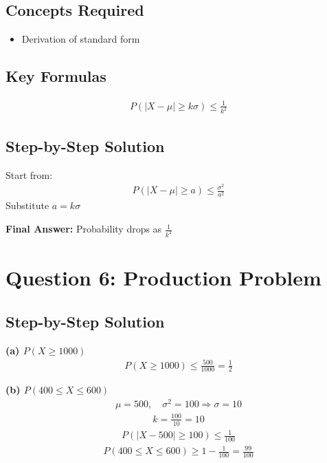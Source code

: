 \documentclass{article}
\begin{document}
\subsection{Concepts Required}
\begin{itemize}
\item Derivation of standard form
\end{itemize}

\subsection{Key Formulas}
\begin{align}
P(|X - \mu| \ge k\sigma) \le \frac{1}{k^2}
\end{align}

\subsection{Step-by-Step Solution}
Start from:
\begin{align}
P(|X - \mu| \ge a) \le \frac{\sigma^2}{a^2}
\end{align}
Substitute $a = k\sigma$

\textbf{Final Answer:} Probability drops as $\frac{1}{k^2}$

\section{Question 6: Production Problem}

\subsection{Step-by-Step Solution}

\textbf{(a) $P(X \ge 1000)$}
\begin{align}
P(X \ge 1000) \le \frac{500}{1000} = \frac{1}{2}
\end{align}

\textbf{(b) $P(400 \le X \le 600)$}
\begin{align}
\mu = 500,\quad \sigma^2 = 100 \Rightarrow \sigma = 10
\end{align}
\begin{align}
k = \frac{100}{10} = 10
\end{align}
\begin{align}
P(|X - 500| \ge 100) \le \frac{1}{100}
\end{align}
\begin{align}
P(400 \le X \le 600) \ge 1 - \frac{1}{100} = \frac{99}{100}
\end{align}
\end{document}

